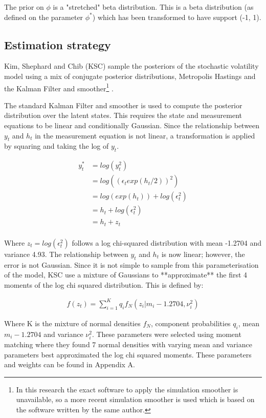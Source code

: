 \documentclass[12pt, a4paper]{article}
\begin{document}
    The prior on $\phi$ is a "stretched" beta distribution. This is a beta distribution (as defined on the parameter $\phi^*$) which has been transformed to have support (-1, 1).

    \subsection{Estimation strategy}
        Kim, Shephard and Chib (KSC) sample the posteriors of the stochastic volatility model using a mix of conjugate posterior distributions, Metropolis Hastings and the Kalman Filter and smoother\footnote{In this research the exact software to apply the simulation smoother is unavailable, so a more recent simulation smoother is used which is based on the software written by the same author.} \citep{dejong1995}.

        The standard Kalman Filter and smoother is used to compute the posterior distribution over the latent states. This requires the state and measurement equations to be linear and conditionally Gaussian. Since the relationship between $y_t$ and $h_t$ in the measurement equation is not linear, a transformation is applied by squaring and taking the log of $y_t$.

        $$
        \begin{aligned}
        y_t^{*} &= log(y_t^2) \\ 
        &= log((\epsilon_t exp(h_t/2))^2) \\
        &=  log(exp(h_t)) + log(\epsilon_t^2) \\
        &= h_t + log(\epsilon_t^2)  \\
        &= h_t + z_t \\
        \end{aligned}
        $$

        Where $z_t = log(\epsilon_t^2)$ follows a log chi-squared distribution with mean -1.2704 and variance 4.93. The relationship between $y_t$ and $h_t$ is now linear; however, the error is not Gaussian. Since it is not simple to sample from this parameterisation of the model, KSC use a mixture of Gaussians to **approximate** the first 4 moments of the log chi squared distribution. This is defined by:

        $$
        \begin{aligned}
        f(z_t) = \sum_{i=1}^{K} q_if_N(z_i|m_i-1.2704, \nu_i^2)
        \end{aligned}
        $$

        Where K is the mixture of normal densities $f_N$, component probabilities $q_i$, mean $m_i-1.2704$ and variance $\nu_i^2$. These parameters were selected using moment matching where they found 7 normal densities with varying mean and variance parameters best approximated the log chi squared moments. These parameters and weights can be found in Appendix A.
\end{document}
